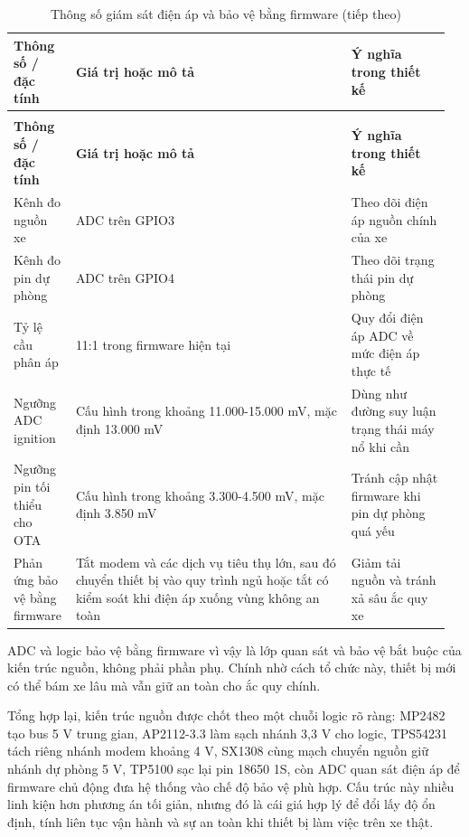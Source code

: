 \documentclass[a4paper]{extarticle}
\newcommand{\thesisterm}[1]{{\rmfamily #1}}
\newcommand{\thesissettableid}[2]{%
  \renewcommand{\thetable}{#1}%
  \renewcommand{\theHtable}{#2}%
}
\begin{document}
{\thesissettableid{3.12F}{condensed-bang-3-12f-thong-so-giam-sat-dien-ap-va-bao-ve-bang-firmware}
\def\LTcaptype{table}
\begin{longtable}{|L{0.125\linewidth}|L{0.612\linewidth}|L{0.221\linewidth}|}
\caption{Thông số giám sát điện áp và bảo vệ bằng firmware}\label{tab:condensed-bang-3-12f-thong-so-giam-sat-dien-ap-va-bao-ve-bang-firmware}\\
\hline
\textbf{Thông số / đặc tính} & \textbf{Giá trị hoặc mô tả} & \textbf{Ý nghĩa trong thiết kế} \\
\hline
\endfirsthead
\caption[]{Thông số giám sát điện áp và bảo vệ bằng firmware (tiếp theo)}\\
\hline
\textbf{Thông số / đặc tính} & \textbf{Giá trị hoặc mô tả} & \textbf{Ý nghĩa trong thiết kế} \\
\hline
\endhead
\endfoot
\endlastfoot
Kênh đo nguồn xe & ADC trên \thesisterm{GPIO3} & Theo dõi điện áp nguồn chính của xe \\\hline
Kênh đo pin dự phòng & ADC trên \thesisterm{GPIO4} & Theo dõi trạng thái pin dự phòng \\\hline
Tỷ lệ cầu phân áp & 11:1 trong firmware hiện tại & Quy đổi điện áp ADC về mức điện áp thực tế \\\hline
Ngưỡng ADC ignition & Cấu hình trong khoảng 11.000-15.000 mV, mặc định 13.000 mV & Dùng như đường suy luận trạng thái máy nổ khi cần \\\hline
Ngưỡng pin tối thiểu cho OTA & Cấu hình trong khoảng 3.300-4.500 mV, mặc định 3.850 mV & Tránh cập nhật firmware khi pin dự phòng quá yếu \\\hline
Phản ứng bảo vệ bằng firmware & Tắt modem và các dịch vụ tiêu thụ lớn, sau đó chuyển thiết bị vào quy trình ngủ hoặc tắt có kiểm soát khi điện áp xuống vùng không an toàn & Giảm tải nguồn và tránh xả sâu ắc quy xe \\\hline
\end{longtable}
}

ADC và logic bảo vệ bằng firmware vì vậy là lớp quan sát và bảo vệ bắt buộc
của kiến trúc nguồn, không phải phần phụ. Chính nhờ cách tổ chức này, thiết bị
mới có thể bám xe lâu mà vẫn giữ an toàn cho ắc quy chính.

Tổng hợp lại, kiến trúc nguồn được chốt theo một chuỗi logic rõ ràng: MP2482
tạo bus 5 V trung gian, AP2112-3.3 làm sạch nhánh 3,3 V cho logic, TPS54231
tách riêng nhánh modem khoảng 4 V, SX1308 cùng mạch chuyển nguồn giữ nhánh dự phòng
5 V, TP5100 sạc lại pin 18650 1S, còn ADC quan sát điện áp để firmware chủ
động đưa hệ thống vào chế độ bảo vệ phù hợp. Cấu trúc này nhiều linh kiện
hơn phương án tối giản, nhưng đó là cái giá hợp lý để đổi lấy độ ổn định,
tính liên tục vận hành và sự an toàn khi thiết bị làm việc trên xe thật.
\end{document}
